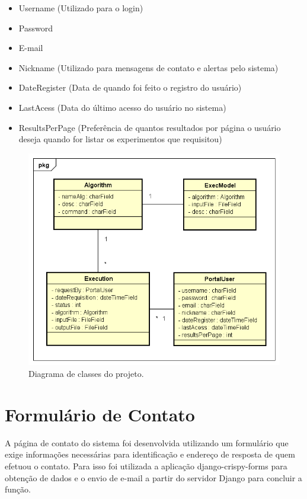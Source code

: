 \documentclass[tg]{mdtufsm}
\begin{document}
\begin{itemize}
	\item Username (Utilizado para o login)
	\item Password 
	\item E-mail
	\item Nickname (Utilizado para mensagens de contato e alertas pelo sistema)
	\item DateRegister (Data de quando foi feito o registro do usuário)
	\item LastAcess (Data do último acesso do usuário no sistema)
	\item ResultsPerPage (Preferência de quantos resultados por página o usuário deseja quando for listar os experimentos que requisitou)
\end{itemize}

\begin{figure}
	\centering
	\includegraphics[width=1\textwidth]{class_diagran_tg}
	\caption{
		Diagrama de classes do projeto.
	}
	\label{fig:classdiagram}
\end{figure}


\section{Formulário de Contato}
A página de contato do sistema foi desenvolvida utilizando um formulário que exige informações necessárias para identificação e endereço de resposta de quem efetuou o contato. Para isso foi utilizada a aplicação django-crispy-forms para obtenção de dados e o envio de e-mail a partir do servidor Django para concluir a função.
\end{document}
